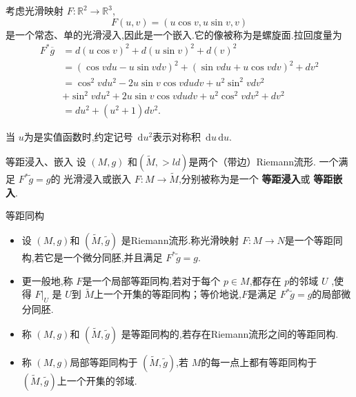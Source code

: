 \documentclass[../../几何与拓扑.tex]{subfiles}
\begin{document}
\begin{example}
    考虑光滑映射 $ F: \mathbb{R} ^{2}\to \mathbb{R} ^{3} $, $$
    F\left( u,v \right)= \left( u\cos v,u\sin v,v \right)  
    $$是一个常态、单的光滑浸入,因此是一个嵌入.它的像被称为是螺旋面.拉回度量为 $$\begin{aligned}F^{*}\overline{g}&=d(u\cos v)^2+d(u\sin v)^2+d(v)^2\\&=(\cos vdu-u\sin vdv)^2+(\sin vdu+u\cos vdv)^2+dv^2\\&=\cos^2vdu^2-2u\sin v\cos vdudv+u^2\sin^2vdv^2\\&+\sin^2vdu^2+2u\sin v\cos vdudv+u^2\cos^2vdv^2+dv^2\\&=du^2+(u^2+1)dv^2.\end{aligned}$$ 
\end{example}
\begin{remark}
    当 $ u $为是实值函数时,约定记号 $ \,\mathrm{d} u^{2} $表示对称积 $ \,\mathrm{d} u\,\mathrm{d} u $.   
\end{remark}

\begin{definition}{等距浸入、嵌入}
    设 \(  \left( M,g \right)   \)  和\(  \left( \tilde{M},> ld \right)   \)是两个（带边）Riemann流形.
     一个满足   \(  F^{*} \tilde{g} =  g  \)的 光滑浸入或嵌入 \(  F:M\to  \tilde{M}  \),分别被称为是一个  
     \textbf{等距浸入}或 \textbf{等距嵌入}.
\end{definition}


\begin{definition}{等距同构}
  \begin{itemize}
    \item  设 $ \left( M,g \right)  $和 $ \left( \tilde{M},\tilde{g} \right)  $  是Riemann流形.称光滑映射 $ F:M\to N $是一个等距同构,若它是一个微分同胚,并且满足 $ F^{*}\tilde{g}=g $.
    \item 更一般地,称 $ F $是一个局部等距同构,若对于每个 $ p \in M $,都存在 $ p $的邻域 $ U $ ,使得 $ F|_{U} $  是 $ U $到 $ \tilde{M} $上一个开集的等距同构；等价地说,$ F $是满足 $ F^{*} \tilde{g}=g $的局部微分同胚.    
    \item 称 $ \left( M,g \right)  $和 $ \left( \tilde{M},\tilde{g} \right)  $  是等距同构的,若存在Riemann流形之间的等距同构.
    \item 称 $ \left( M,g \right)  $局部等距同构于 $ \left( \tilde{M},\tilde{g} \right)  $,若 $ M $的每一点上都有等距同构于 $ \left( \tilde{M},\tilde{g} \right)  $上一个开集的邻域.    
  \end{itemize}
  
\end{definition}
\end{document}
